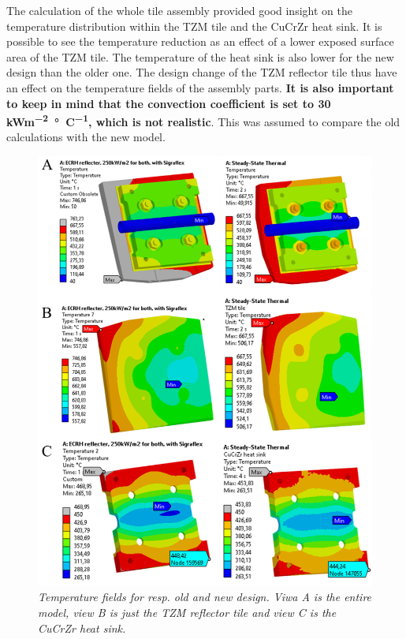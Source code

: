 \normalsize{\indent The calculation of the whole tile assembly provided good insight on the temperature distribution within the \acrshort{TZM} tile and the \acrshort{CuCrZr} heat sink. It is possible to see the temperature reduction as an effect of a lower exposed surface area of the \acrshort{TZM} tile. The temperature of the heat sink is also lower for the new design than the older one. The design change of the \acrshort{TZM} reflector tile thus have an effect on the temperature fields of the assembly parts. {\bfseries It is also important to keep in mind that the convection coefficient is set to 30 \unit{kWm^{-2}\si{\degree}C^{-1}}, which is not realistic}. This was assumed to compare the old calculations with the new model.}
\\
\begin{figure}[h!]
    \label{fig_5_4} 
    \centering
    \includegraphics[width=.9\textwidth]{figures/OLDVSNEWTEMPERATUREFRINGES.png}
    \caption{\it Temperature fields for resp. old and new design. Viwa A is the entire model, view B is just the \acrshort{TZM} reflector tile and view C is the \acrshort{CuCrZr} heat sink.}
\end{figure}
\\

